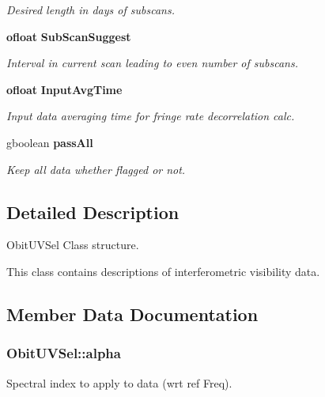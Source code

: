 \begin{CompactItemize}
\begin{CompactList}\small\item\em Desired length in days of subscans. \item\end{CompactList}\item 
{\bf ofloat} {\bf Sub\-Scan\-Suggest}
\begin{CompactList}\small\item\em Interval in current scan leading to even number of subscans. \item\end{CompactList}\item 
{\bf ofloat} {\bf Input\-Avg\-Time}
\begin{CompactList}\small\item\em Input data averaging time for fringe rate decorrelation calc. \item\end{CompactList}\item 
gboolean {\bf pass\-All}
\begin{CompactList}\small\item\em Keep all data whether flagged or not. \item\end{CompactList}\end{CompactItemize}


\subsection{Detailed Description}
Obit\-UVSel Class structure. 

This class contains descriptions of interferometric visibility data. 



\subsection{Member Data Documentation}
\subsubsection{ {\bf Obit\-UVSel::alpha}}\label{structObitUVSel_o34}


Spectral index to apply to data (wrt ref Freq). 

